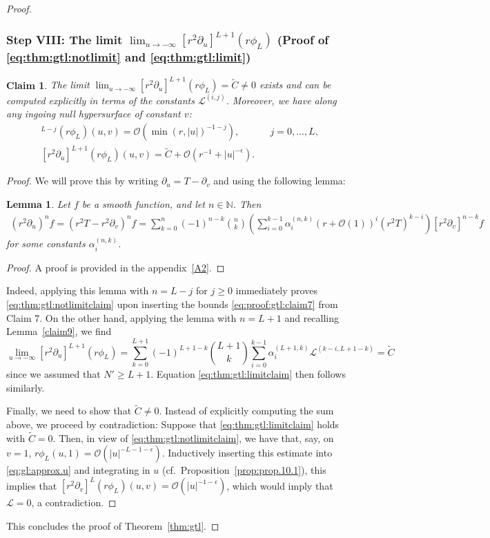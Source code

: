 \documentclass[11pt,english]{article}
\numberwithin{equation}{section}
\newtheorem{lemma}{Lemma}[section]
\theoremstyle{remark}
\theoremstyle{plain}
\newtheorem{claim}{Claim}
\newenvironment{nalign}{
    \begin{equation}
    \begin{aligned}
}{
    \end{aligned}
    \end{equation}
    \ignorespacesafterend
}
\theoremstyle{remark}
\newcommand{\pu}{\partial_u}
\newcommand{\pv}{\partial_v}
\renewcommand{\(}{\left(}
\renewcommand{\)}{\right)}
\begin{document}
\begin{proof}
\subsubsection*{Step VIII: The limit $\lim_{u\to-\infty}[r^2\pu]^{L+1}(r\phi_L)$ (Proof of \eqref{eq:thm:gtl:notlimit} and \eqref{eq:thm:gtl:limit})}
\begin{claim}\label{calim9}
The limit $\lim_{u\to-\infty}[r^2\pu]^{L+1}(r\phi_L)=\tilde C\neq 0$ exists and can be computed explicitly in terms of the constants $\mathcal{L}^{(i,j)}$. Moreover, we have along any ingoing null hypersurface of constant $v$:
\begin{align}
[r^2\pu]^{L-j}(r\phi_L)(u,v)=\mathcal{O}(\min(r,|u|)^{-1-
j}),&&j=0,\dots, L,\label{eq:thm:gtl:notlimitclaim}\\
[r^2\pu]^{L+1}(r\phi_L)(u,v)=\tilde{C}+\mathcal{O}(r^{-1}+|u|^{-\epsilon}).&&\label{eq:thm:gtl:limitclaim}
\end{align}
\end{claim}
\begin{proof}
We will prove this by writing $\pu=T-\pv$ and using the following lemma:
\begin{lemma}\label{lemma:pu=t-pv}
Let $f$ be a smooth function, and let $n\in\mathbb{N}$. Then
\begin{nalign}\label{eq:lemmapp}
(r^2\pu)^n f=(r^2T-r^2\pv)^nf
=\sum_{k=0}^n (-1)^{n-k}\binom{n}{k}\left(\sum_{i=0}^{k-1}\alpha^{(n,k)}_i(r+\mathcal{O}(1))^i(r^2 T)^{k-i}\right)[r^2\pv]^{n-k}f
\end{nalign}
for some constants $\alpha^{(n,k)}_i$.
\end{lemma}
\begin{proof}
A proof is provided in the appendix~\ref{A2}.
\end{proof}
Indeed, applying this lemma with $n=L-j$ for $j\geq0$ immediately proves \eqref{eq:thm:gtl:notlimitclaim} upon inserting the bounds \eqref{eq:proof:gtl:claim7} from Claim 7.
On the other hand, applying the lemma with $n=L+1$ and recalling Lemma~\ref{claim9}, we find
\begin{equation}\label{combination}
\lim_{u\to-\infty}[r^2\pu]^{L+1}(r\phi_L)=\sum_{k=0}^{L+1}(-1)^{L+1-k}\binom{L+1}{k}\sum_{i=0}^{k-1}\alpha^{(L+1,k)}_i \mathcal{L}^{(k-i,L+1-k)}=\tilde C
\end{equation}
since we assumed that $N'\geq L+1$. Equation \eqref{eq:thm:gtl:limitclaim} then follows similarly.

Finally, we need to show that $\tilde C\neq 0$. 
Instead of explicitly computing the sum above, we proceed by contradiction: 
Suppose that \eqref{eq:thm:gtl:limitclaim} holds with $\tilde C= 0$. 
Then, in view of \eqref{eq:thm:gtl:notlimitclaim}, we have that, say, on $v=1$, $r\phi_L(u,1)=\mathcal O(|u|^{-L-1-\epsilon})$. 
Inductively inserting this estimate into \eqref{eq:gl:approx.u} and integrating in $u$ (cf.\ Proposition~\ref{prop:prop.10.1}), this implies that $[r^2\pv]^L(r\phi_L)(u,v)=\mathcal O(|u|^{-1-\epsilon})$, which would imply that $\mathcal L=0$, a contradiction.
\end{proof}

This concludes the proof of Theorem~\ref{thm:gtl}.
\end{proof}
\end{document}
